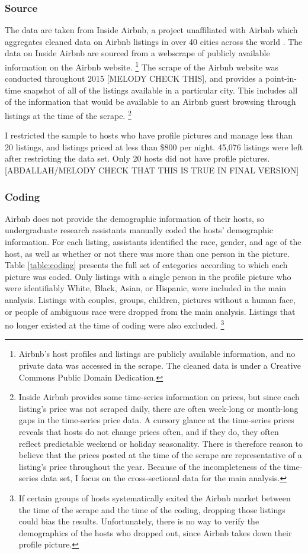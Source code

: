 \subsubsection*{Source} 
The data are taken from Inside Airbnb, a project unaffiliated with Airbnb which aggregates cleaned data on Airbnb listings in over 40 cities across the world \citep{insideairbnb}. The data on Inside Airbnb are sourced from a webscrape of publicly available information on the Airbnb website.%
\footnote{Airbnb's host profiles and listings are publicly available information, and no private data was accessed in the scrape. The cleaned data is under a Creative Commons Public Domain Dedication.} 
The scrape of the Airbnb website was conducted throughout 2015 [MELODY CHECK THIS], and provides a point-in-time snapshot of all of the listings available in a particular city. This includes all of the information that would be available to an Airbnb guest browsing through listings at the time of the scrape.%
\footnote{Inside Airbnb provides some time-series information on prices, but since each listing's price was not scraped daily, there are often week-long or month-long gaps in the time-series price data. A cursory glance at the time-series prices reveals that hosts do not change prices often, and if they do, they often reflect predictable weekend or holiday seasonality. There is therefore reason to believe that the prices posted at the time of the scrape are representative of a listing's price throughout the year. Because of the incompleteness of the time-series data set, I focus on the cross-sectional data for the main analysis.} 

I restricted the sample to hosts who have profile pictures and manage less than 20 listings, and listings priced at less than \$800 per night. 45,076 listings were left after restricting the data set. Only 20 hosts did not have profile pictures. [ABDALLAH/MELODY CHECK THAT THIS IS TRUE IN FINAL VERSION]

\subsubsection*{Coding} 
Airbnb does not provide the demographic information of their hosts, so undergraduate research assistants manually coded the hosts' demographic information. For each listing, assistants identified the race, gender, and age of the host, as well as whether or not there was more than one person in the picture. Table \ref{table:coding} presents the full set of categories according to which each picture was coded. Only listings with a single person in the profile picture who were identifiably White, Black, Asian, or Hispanic, were included in the main analysis. Listings with couples, groups, children, pictures without a human face, or people of ambiguous race were dropped from the main analysis. Listings that no longer existed at the time of coding were also excluded.%
\footnote{If certain groups of hosts systematically exited the Airbnb market between the time of the scrape and the time of the coding, dropping those listings could bias the results. Unfortunately, there is no way to verify the demographics of the hosts who dropped out, since Airbnb takes down their profile picture.}

